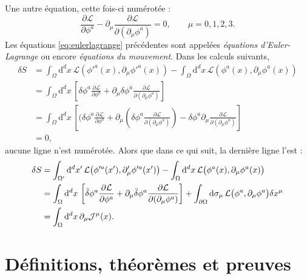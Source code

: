 \documentclass[12pt,twoside,maitrise]{dms}
\theoremstyle{definition}
\numberwithin{equation}{section}
\numberwithin{table}{chapter}
\numberwithin{figure}{chapter}
\begin{document}
Une autre équation, cette fois-ci numérotée :
\begin{equation}
    \label{eq:eulerlagrange}
    \frac{\partial\mathcal{L}}{\partial\phi^a}-\partial_\mu\frac{\partial\mathcal{L}}{\partial(\partial_\mu\phi^a)}=0,\qquad\mu=0,1,2,3.
\end{equation}
Les équations \eqref{eq:eulerlagrange} précédentes sont appelées \emph{équations d'Euler-Lagrange} ou encore \emph{équations du mouvement}. Dans les calculs suivants,
\begin{align*}
  \delta S
    & = \int_\Omega \mathrm{d}^dx\, \mathcal{L}\left(\phi'^a(x), \partial_\mu\phi'^a(x)\right)
        - \int_\Omega \mathrm{d}^dx\, \mathcal{L}\left(\phi^a(x), \partial_\mu\phi^a(x)\right)\\
    & = \int_\Omega \mathrm{d}^dx\, \left[\delta \phi^a \frac{\partial\mathcal{L}}{\partial\phi^a}
        + \partial_\mu \delta\phi^a \frac{\partial\mathcal{L}}{\partial(\partial_\mu\phi^a)}\right]\\
    & = \int_\Omega \mathrm{d}^dx\, \left[(\delta\phi^a \frac{\partial\mathcal{L}}{\partial\phi^a}
       + \partial_\mu \left(\delta \phi^a \frac{\partial\mathcal{L}}{\partial(\partial_\mu\phi^a)}\right)
       - \delta\phi^a \partial_\mu \frac{\partial\mathcal{L}}{\partial(\partial_\mu\phi^a)}\right]\\
    & = 0,
\end{align*}
aucune ligne n'est numérotée. Alors que dans ce qui suit, la derni\`ere ligne l'est :
\begin{align}
  \delta S
    &= \int_{\Omega'} \mathrm{d}^dx' \,\mathcal{L}\bigl(\phi'^a(x'), \partial'_\mu\phi'^a(x')\bigr)
        - \int_\Omega\mathrm{d}^dx\,\mathcal{L}\bigl(\phi^a(x),\partial_\mu\phi^a(x)\bigr)
        \notag\\
    & = \int_\Omega \mathrm{d}^dx \,\left[\bar{\delta}\phi^a \frac{\partial\mathcal{L}}{\partial\phi^a}
        + \partial_\mu \bar{\delta} \phi^a \frac{\partial\mathcal{L}}{\partial(\partial_\mu\phi^a)}\right]
        + \int_{\partial\Omega}\mathrm{d} \sigma_\mu\,\mathcal{L}
        \bigl(\phi^a,\partial_\mu\phi^a\bigr)\delta x^\mu
        \notag\\
    & = \int_\Omega\mathrm{d}^dx\,\partial_\mu\mathcal{J}^\mu(x).
        \label{eq:variationaction}
\end{align}

\section{Définitions, théorèmes et preuves}
\end{document}
